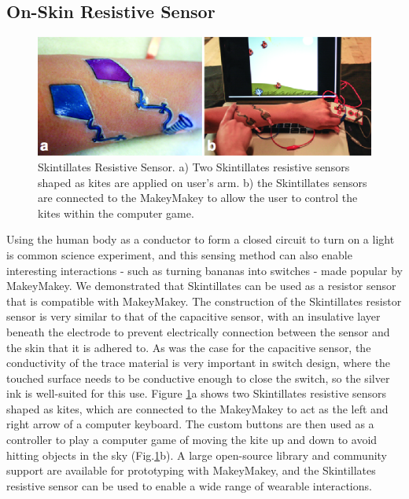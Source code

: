 \documentclass{sigchi}
\begin{document}
\subsection {On-Skin Resistive Sensor}
\begin{figure} [h!]
\centering
\includegraphics[width=1\columnwidth]{figures/Figure9}
\caption{Skintillates Resistive Sensor. a) Two Skintillates resistive sensors shaped as kites are applied on user's arm. b) the Skintillates sensors are connected to the MakeyMakey to allow the user to control the kites within the computer game.}
\vspace{-8pt}
\label{fig:resisitve}
\end{figure}
Using the human body as a conductor to form a closed circuit to turn on a light is common science experiment, and this sensing method can also enable interesting interactions - such as turning bananas into switches - made popular by MakeyMakey. We demonstrated that Skintillates can be used as a resistor sensor that is compatible with MakeyMakey. The construction of the Skintillates resistor sensor is very similar to that of the capacitive sensor, with an insulative layer beneath the electrode to prevent electrically connection between the sensor and the skin that it is adhered to. As was the case for the capacitive sensor, the conductivity of the trace material is very important in switch design, where the touched surface needs to be conductive enough to close the switch, so the silver ink is well-suited for this use. Figure \ref{fig:resisitve}a shows two Skintillates resistive sensors shaped as kites, which are connected to the MakeyMakey to act as the left and right arrow of a computer keyboard. The custom buttons are then used as a controller to play a computer game of moving the kite up and down to avoid hitting objects in the sky (Fig.\ref{fig:resisitve}b). A large open-source library and community support are available for prototyping with MakeyMakey, and the Skintillates resistive sensor can be used to enable a wide range of wearable interactions. 
\end{document}
